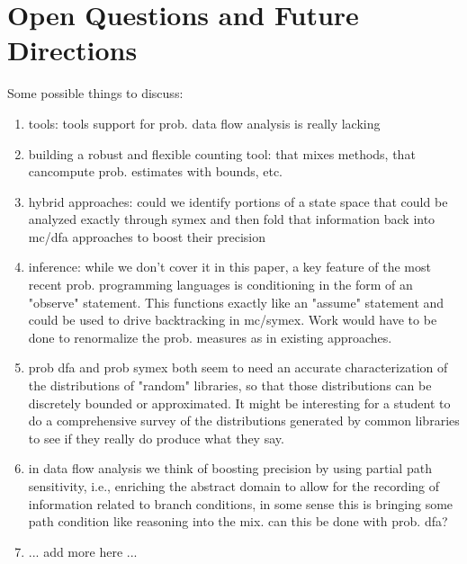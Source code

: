 \section{Open Questions and Future Directions}
\label{sec:future}

Some possible things to discuss:
\begin{enumerate}
\item tools: tools support for prob. data flow analysis is really lacking
\item building a robust and flexible counting tool: that mixes methods, that cancompute prob. estimates with bounds, etc.
\item hybrid approaches: could we identify portions of a state
space that could be analyzed exactly through symex and then fold
that information back into mc/dfa approaches to boost their precision
\item inference: while we don't cover it in this paper, a key feature of
the most recent prob. programming languages is conditioning in the form
of an "observe" statement.  This functions exactly like an "assume" 
statement and could be used to drive backtracking in mc/symex.  Work
would have to be done to renormalize the prob. measures as in existing
approaches.
\item prob dfa and prob symex both seem to need an accurate characterization
of the distributions of "random" libraries, so that those distributions can be 
discretely bounded or approximated.  It might be interesting for a student
to do a comprehensive survey of the distributions generated by common
libraries to see if they really do produce what they say.
\item in data flow analysis we think of boosting precision by using partial
path sensitivity, i.e., enriching the abstract domain to allow for the recording of information related to branch conditions, in some sense this is bringing some path condition like reasoning into the mix.  can this be done with prob. dfa?
\item ... add more here ...
\end{enumerate}
